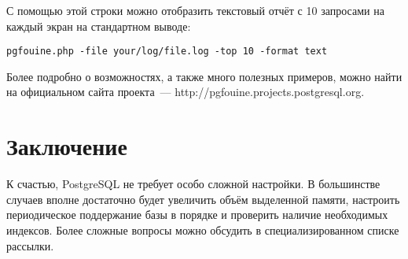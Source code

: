 С помощью этой строки можно отобразить текстовый отчёт с 10 запросами на каждый экран на стандартном выводе:
\begin{lstlisting}[label=lst:sql_performance8,caption=pgFouine]
pgfouine.php -file your/log/file.log -top 10 -format text
\end{lstlisting}

Более подробно о возможностях, а также много полезных примеров, можно найти на официальном сайта проекта~--- 
http://pgfouine.projects.postgresql.org.


\section{Заключение}
К счастью, PostgreSQL не требует особо сложной настройки. В большинстве случаев вполне достаточно будет увеличить 
объём выделенной памяти, настроить периодическое поддержание базы в порядке и проверить наличие необходимых индексов. 
Более сложные вопросы можно обсудить в специализированном списке рассылки.
